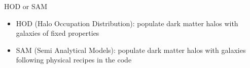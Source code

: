 \begin{frame}
\begin{columns}
        \begin{column}{0.64\textwidth}
            \vspace{3cm}
            \begin{minipage}[c][0.4\textheight][c]{\linewidth}
                \begin{block}{HOD or SAM}
                    \begin{itemize}
                        \item<1-> HOD (Halo Occupation Distribution):
                            populate dark matter halos with galaxies of fixed
                            properties
                        \item<2-> SAM (Semi Analytical Models): populate dark
                            matter halos with galaxies following physical
                            recipes in the code
                    \end{itemize}
                \end{block}
            \end{minipage}
        \end{column}
        \begin{column}{0.5\textwidth}
        \end{column}
    \end{columns}
\end{frame}

